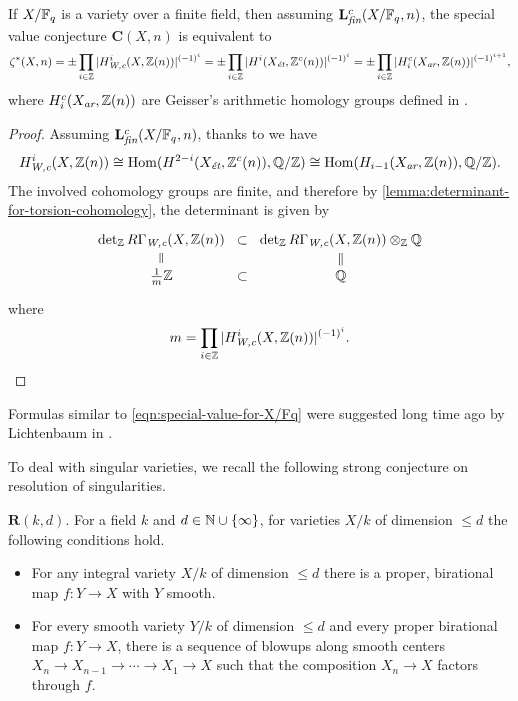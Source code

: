 \documentclass{article}
\numberwithin{equation}{section}
\begin{document}
\begin{proposition}
  \label{prop:C(X,n)-over-finite-fields}
  If $X/\FF_q$ is a variety over a finite field, then assuming
  $\mathbf{L}_\fin^c (X/\FF_q,n)$, the special value conjecture
  $\mathbf{C} (X,n)$ is equivalent to
  \begin{equation}
    \label{eqn:special-value-for-X/Fq}
    \zeta^* (X,n) = \pm \prod_{i \in \ZZ} |H_\Wc^i (X, \ZZ(n))|^{(-1)^i}
    = \pm \prod_{i \in \ZZ} |H^i (X_\et, \ZZ^c (n))|^{(-1)^i}
    = \pm \prod_{i \in \ZZ} |H_i^c (X_\ar, \ZZ (n))|^{(-1)^{i+1}},
  \end{equation}
  where $H_i^c (X_\ar, \ZZ (n))$ are Geisser's arithmetic homology groups
  defined in \cite{Geisser-2010-arithmetic-homology}.

  \begin{proof}
    Assuming $\mathbf{L}_\fin^c (X/\FF_q,n)$, thanks to
    \cite[Proposition~7.9]{Beshenov-Weil-etale-1} we have
    \[ H^i_\Wc (X, \ZZ (n)) \cong
      \Hom (H^{2-i} (X_\et, \ZZ^c (n)), \QQ/\ZZ) \cong
      \Hom (H_{i-1} (X_\ar, \ZZ (n)), \QQ/\ZZ). \]
    The involved cohomology groups are finite, and therefore by
    \ref{lemma:determinant-for-torsion-cohomology}, the determinant is given by
    \[ \begin{tikzcd}[row sep=0.75em, column sep=0pt]
        \det_\ZZ R\Gamma_\Wc (X, \ZZ (n)) \ar[equals]{d} & \subset & \det_\ZZ R\Gamma_\Wc (X, \ZZ (n)) \otimes_\ZZ \QQ \ar[equals]{d} \\
        \frac{1}{m}\ZZ & \subset & \QQ
      \end{tikzcd} \]
    where
    \[ m = \prod_{i \in \ZZ} |H_\Wc^i (X, \ZZ(n))|^{(-1)^i}. \qedhere \]
  \end{proof}
\end{proposition}

\begin{remark}
  Formulas similar to \eqref{eqn:special-value-for-X/Fq} were suggested long
  time ago by Lichtenbaum in \cite{Lichtenbaum-1984}.
\end{remark}

To deal with singular varieties, we recall the following strong conjecture on
resolution of singularities.

\begin{conjecture}
  $\mathbf{R} (k,d)$. For a field $k$ and $d \in \NN \cup \{ \infty \}$, for
  varieties $X/k$ of dimension $\le d$ the following conditions hold.
  \begin{itemize}
  \item For any integral variety $X/k$ of dimension $\le d$ there is a proper,
    birational map $f\colon Y \to X$ with $Y$ smooth.

  \item For every smooth variety $Y/k$ of dimension $\le d$ and every proper
    birational map $f\colon Y\to X$, there is a sequence of blowups along smooth
    centers
    $X_n \to X_{n-1} \to \cdots \to X_1 \to X$
    such that the composition $X_n \to X$ factors through $f$.
  \end{itemize}
\end{conjecture}
\end{document}
